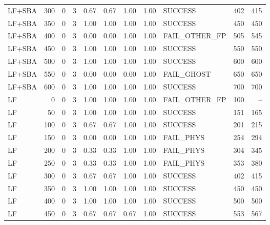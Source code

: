 \begin{tabular}{lrrr|rrrr|lrr}
  LF+SBA                         &  300 &    0 &   3 & 0.67 & 0.67 & 1.00 & 1.00 & SUCCESS         &   402 &   415 \\
  LF+SBA                         &  350 &    0 &   3 & 1.00 & 1.00 & 1.00 & 1.00 & SUCCESS         &   450 &   450 \\
  LF+SBA                         &  400 &    0 &   3 & 0.00 & 0.00 & 1.00 & 1.00 & FAIL_OTHER_FP   &   505 &   545 \\
  LF+SBA                         &  450 &    0 &   3 & 1.00 & 1.00 & 1.00 & 1.00 & SUCCESS         &   550 &   550 \\
  LF+SBA                         &  500 &    0 &   3 & 1.00 & 1.00 & 1.00 & 1.00 & SUCCESS         &   600 &   600 \\
  LF+SBA                         &  550 &    0 &   3 & 0.00 & 0.00 & 0.00 & 1.00 & FAIL_GHOST      &   650 &   650 \\
  LF+SBA                         &  600 &    0 &   3 & 1.00 & 1.00 & 1.00 & 1.00 & SUCCESS         &   700 &   700 \\
  LF                             &    0 &    0 &   3 & 1.00 & 1.00 & 1.00 & 1.00 & FAIL_OTHER_FP   &   100 &    -- \\
  LF                             &   50 &    0 &   3 & 1.00 & 1.00 & 1.00 & 1.00 & SUCCESS         &   151 &   165 \\
  LF                             &  100 &    0 &   3 & 0.67 & 0.67 & 1.00 & 1.00 & SUCCESS         &   201 &   215 \\
  LF                             &  150 &    0 &   3 & 0.00 & 0.00 & 1.00 & 1.00 & FAIL_PHYS       &   254 &   294 \\
  LF                             &  200 &    0 &   3 & 0.33 & 0.33 & 1.00 & 1.00 & FAIL_PHYS       &   304 &   345 \\
  LF                             &  250 &    0 &   3 & 0.33 & 0.33 & 1.00 & 1.00 & FAIL_PHYS       &   353 &   380 \\
  LF                             &  300 &    0 &   3 & 0.67 & 0.67 & 1.00 & 1.00 & SUCCESS         &   402 &   415 \\
  LF                             &  350 &    0 &   3 & 1.00 & 1.00 & 1.00 & 1.00 & SUCCESS         &   450 &   450 \\
  LF                             &  400 &    0 &   3 & 1.00 & 1.00 & 1.00 & 1.00 & SUCCESS         &   500 &   500 \\
  LF                             &  450 &    0 &   3 & 0.67 & 0.67 & 0.67 & 1.00 & SUCCESS         &   553 &   567 \\

\end{tabular}
